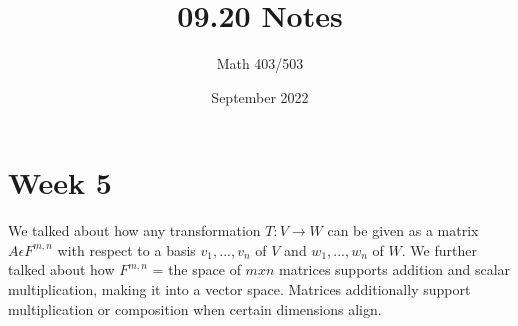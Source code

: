 \documentclass{article}
\title{09.20 Notes}
\author{Math 403/503 }
\date{September 2022}
\begin{document}
\maketitle

\section{Week 5}
We talked about how any transformation $T: V \rightarrow W $ can be given as a matrix $A \epsilon F^{m,n}$ with respect to a basis $v_1,...,v_n$ of $V$ and $w_1,..., w_n$ of $W$. We further talked about how $F^{m,n}$ = the space of $m x n$ matrices supports addition and scalar multiplication, making it into a vector space. Matrices additionally support multiplication or composition when certain dimensions align. \\
\end{document}
